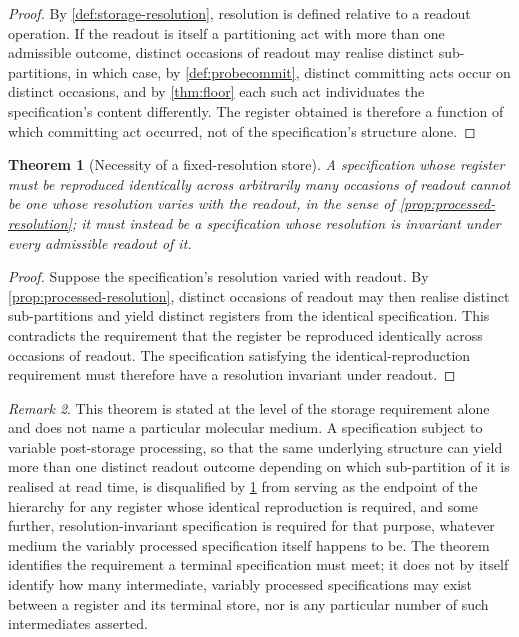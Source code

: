 \documentclass[11pt,twocolumn,a4paper]{article}
\theoremstyle{plain}
\newtheorem{theorem}{Theorem}[section]
\theoremstyle{definition}
\theoremstyle{remark}
\newtheorem{remark}[theorem]{Remark}
\begin{document}
\begin{proof}
By \cref{def:storage-resolution}, resolution is defined relative to a
readout operation. If the readout is itself a partitioning act with more
than one admissible outcome, distinct occasions of readout may realise
distinct sub-partitions, in which case, by \cref{def:probecommit}, distinct
committing acts occur on distinct occasions, and by \cref{thm:floor} each
such act individuates the specification's content differently. The
register obtained is therefore a function of which committing act
occurred, not of the specification's structure alone.
\end{proof}

\begin{theorem}[Necessity of a fixed-resolution store]
\label{thm:fixed-resolution-necessity}
A specification whose register must be reproduced identically across
arbitrarily many occasions of readout cannot be one whose resolution
varies with the readout, in the sense of \cref{prop:processed-resolution};
it must instead be a specification whose resolution is invariant under
every admissible readout of it.
\end{theorem}

\begin{proof}
Suppose the specification's resolution varied with readout. By
\cref{prop:processed-resolution}, distinct occasions of readout may then
realise distinct sub-partitions and yield distinct registers from the
identical specification. This contradicts the requirement that the
register be reproduced identically across occasions of readout. The
specification satisfying the identical-reproduction requirement must
therefore have a resolution invariant under readout.
\end{proof}

\begin{remark}
This theorem is stated at the level of the storage requirement alone and
does not name a particular molecular medium. A specification subject to
variable post-storage processing, so that the same underlying structure
can yield more than one distinct readout outcome depending on which
sub-partition of it is realised at read time, is disqualified by
\cref{thm:fixed-resolution-necessity} from serving as the endpoint of the
hierarchy for any register whose identical reproduction is required, and
some further, resolution-invariant specification is required for that
purpose, whatever medium the variably processed specification itself
happens to be. The theorem identifies the requirement a terminal
specification must meet; it does not by itself identify how many
intermediate, variably processed specifications may exist between a
register and its terminal store, nor is any particular number of such
intermediates asserted.
\end{remark}
\end{document}

